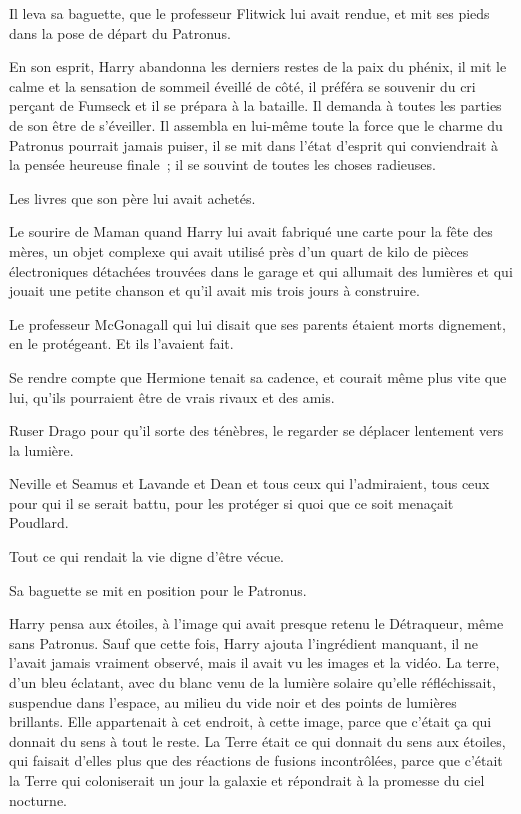 Il leva sa baguette, que le professeur Flitwick lui avait rendue, et mit ses pieds dans la pose de départ du Patronus.

En son esprit, Harry abandonna les derniers restes de la paix du phénix, il mit le calme et la sensation de sommeil éveillé de côté, il préféra se souvenir du cri perçant de Fumseck et il se prépara à la bataille. Il demanda à toutes les parties de son être de s'éveiller. Il assembla en lui-même toute la force que le charme du Patronus pourrait jamais puiser, il se mit dans l'état d'esprit qui conviendrait à la pensée heureuse finale~; il se souvint de toutes les choses radieuses.

Les livres que son père lui avait achetés.

Le sourire de Maman quand Harry lui avait fabriqué une carte pour la fête des mères, un objet complexe qui avait utilisé près d'un quart de kilo de pièces électroniques détachées trouvées dans le garage et qui allumait des lumières et qui jouait une petite chanson et qu'il avait mis trois jours à construire.

Le professeur McGonagall qui lui disait que ses parents étaient morts dignement, en le protégeant. Et ils l'avaient fait.

Se rendre compte que Hermione tenait sa cadence, et courait même plus vite que lui, qu'ils pourraient être de vrais rivaux et des amis.

Ruser Drago pour qu'il sorte des ténèbres, le regarder se déplacer lentement vers la lumière.

Neville et Seamus et Lavande et Dean et tous ceux qui l'admiraient, tous ceux pour qui il se serait battu, pour les protéger si quoi que ce soit menaçait Poudlard.

Tout ce qui rendait la vie digne d'être vécue.

Sa baguette se mit en position pour le Patronus.

Harry pensa aux étoiles, à l'image qui avait presque retenu le Détraqueur, même sans Patronus. Sauf que cette fois, Harry ajouta l'ingrédient manquant, il ne l'avait jamais vraiment observé, mais il avait vu les images et la vidéo. La terre, d'un bleu éclatant, avec du blanc venu de la lumière solaire qu'elle réfléchissait, suspendue dans l'espace, au milieu du vide noir et des points de lumières brillants. Elle appartenait à cet endroit, à cette image, parce que c'était ça qui donnait du sens à tout le reste. La Terre était ce qui donnait du sens aux étoiles, qui faisait d'elles plus que des réactions de fusions incontrôlées, parce que c'était la Terre qui coloniserait un jour la galaxie et répondrait à la promesse du ciel nocturne.

